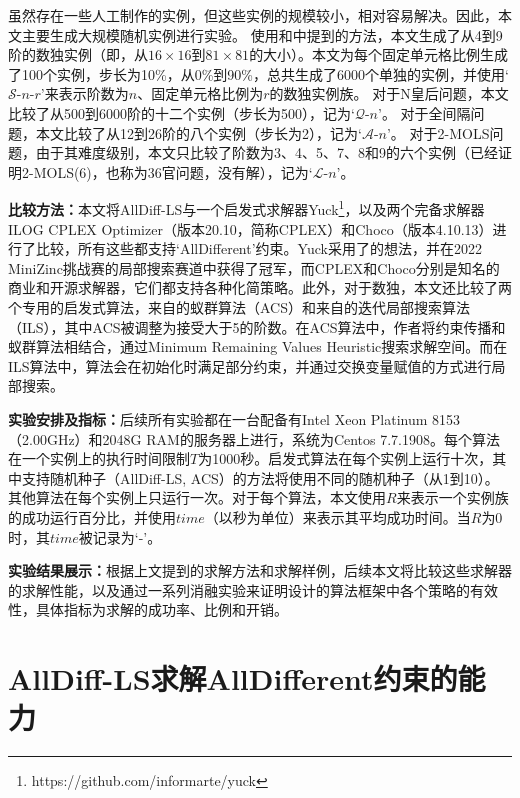 虽然存在一些人工制作的实例\cite{mantere2008solving, zhang2021early}，但这些实例的规模较小，相对容易解决。因此，本文主要生成大规模随机实例进行实验。
使用\cite{lewis2007metaheuristics}和\cite{musliu2017sudoku}中提到的方法，本文生成了从4到9阶的数独实例（即，从$16 \times 16$到$81 \times 81$的大小）。本文为每个固定单元格比例生成了100个实例，步长为10\%，从0\%到90\%，总共生成了6000个单独的实例，并使用`$\mathcal{S}$-$n$-$r$'来表示阶数为$n$、固定单元格比例为$r$的数独实例族。
对于N皇后问题，本文比较了从500到6000阶的十二个实例（步长为500），记为`$\mathcal{Q}$-$n$'。
对于全间隔问题，本文比较了从12到26阶的八个实例（步长为2），记为`$\mathcal{A}$-$n$'。
对于2-MOLS问题，由于其难度级别，本文只比较了阶数为3、4、5、7、8和9的六个实例（已经证明2-MOLS(6)，也称为36官问题，没有解），记为`$\mathcal{L}$-$n$'。

\textbf{比较方法：}本文将AllDiff-LS与一个启发式求解器Yuck\footnote{https://github.com/informarte/yuck}，以及两个完备求解器ILOG CPLEX Optimizer（版本20.10，简称CPLEX）和Choco（版本4.10.13）\cite{prud2019choco}进行了比较，所有这些都支持`AllDifferent'约束。Yuck采用了\cite{bjordal2015constraint}的想法，并在2022 MiniZinc挑战赛的局部搜索赛道中获得了冠军，而CPLEX和Choco分别是知名的商业和开源求解器，它们都支持各种化简策略。此外，对于数独，本文还比较了两个专用的启发式算法，来自\cite{lloyd2020antcolony}的蚁群算法（ACS）和来自\cite{musliu2017sudoku}的迭代局部搜索算法（ILS），其中ACS被调整为接受大于5的阶数。在ACS算法中，作者将约束传播和蚁群算法相结合，通过Minimum Remaining Values Heuristic搜索求解空间。而在ILS算法中，算法会在初始化时满足部分约束，并通过交换变量赋值的方式进行局部搜索。

\textbf{实验安排及指标：}后续所有实验都在一台配备有Intel Xeon Platinum 8153（2.00GHz）和2048G RAM的服务器上进行，系统为Centos 7.7.1908。每个算法在一个实例上的执行时间限制$T$为1000秒。启发式算法在每个实例上运行十次，其中支持随机种子（AllDiff-LS, ACS）的方法将使用不同的随机种子（从1到10）。其他算法在每个实例上只运行一次。对于每个算法，本文使用$R$来表示一个实例族的成功运行百分比，并使用$time$（以秒为单位）来表示其平均成功时间。当$R$为0时，其$time$被记录为`-'。

\textbf{实验结果展示：}根据上文提到的求解方法和求解样例，后续本文将比较这些求解器的求解性能，以及通过一系列消融实验来证明设计的算法框架中各个策略的有效性，具体指标为求解的成功率、比例和开销。


\section{AllDiff-LS求解AllDifferent约束的能力}

